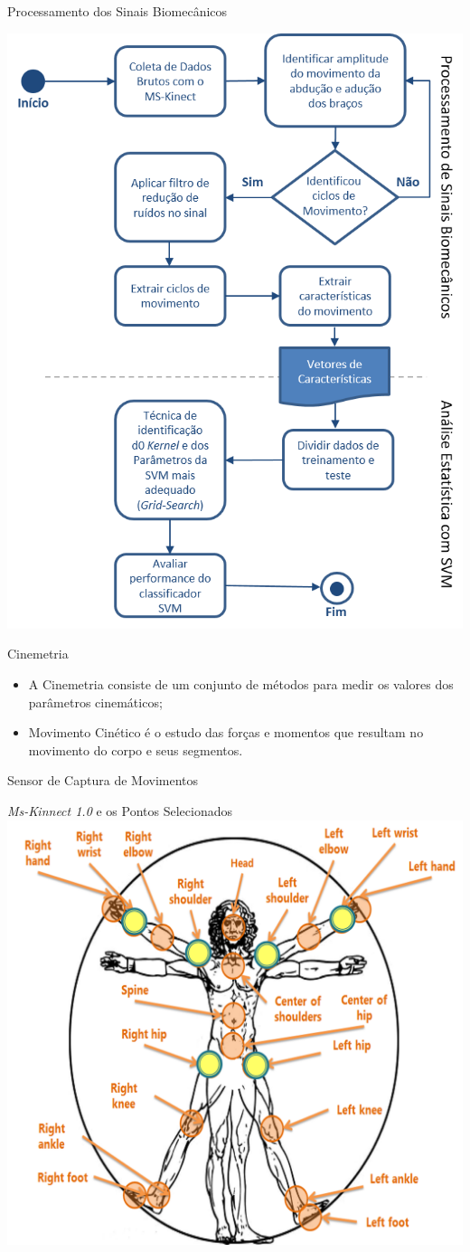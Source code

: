 \documentclass{beamer}
\begin{document}
\begin{frame}{Processamento dos Sinais Biomecânicos}
  \begin{block}{}
      \center \includegraphics[height=2.4 in]{img/biomecprocessor2.png}
  \end{block}
\end{frame}


\begin{frame}{Cinemetria}
  \begin{block}{}
      \begin{itemize}[<+->]
	 \item A Cinemetria consiste de um conjunto de métodos para medir os valores dos parâmetros cinemáticos;
	 \item Movimento Cinético é o estudo das forças e momentos que resultam no movimento do corpo e seus segmentos.
       \end{itemize}
  \end{block}
\end{frame}


\begin{frame}{Sensor de Captura de Movimentos}
  \begin{block}{\textit{Ms-Kinnect 1.0} e os Pontos Selecionados}
      \center \includegraphics[height=2.6 in]{img/articulacoes-sel.png}
  \end{block}
\end{frame}
\end{document}
